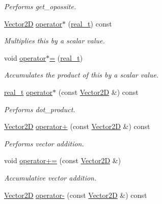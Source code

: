 \begin{DoxyCompactItemize}
\begin{DoxyCompactList}\small\item\em Performs get\+\_\+opossite. \end{DoxyCompactList}\item 
\hyperlink{class_designar_1_1_vector2_d}{Vector2D} \hyperlink{class_designar_1_1_vector2_d_ad0e749363b81d3ec6eb87d7e7d378f63}{operator$\ast$} (\hyperlink{namespace_designar_aca2c32af26808dbec1f3a3071fad25ce}{real\+\_\+t}) const
\begin{DoxyCompactList}\small\item\em Multiplies this by a scalar value. \end{DoxyCompactList}\item 
void \hyperlink{class_designar_1_1_vector2_d_a12aff184fa16acaed9ca926de4fb99c1}{operator$\ast$=} (\hyperlink{namespace_designar_aca2c32af26808dbec1f3a3071fad25ce}{real\+\_\+t})
\begin{DoxyCompactList}\small\item\em Accumulates the product of this by a scalar value. \end{DoxyCompactList}\item 
\hyperlink{namespace_designar_aca2c32af26808dbec1f3a3071fad25ce}{real\+\_\+t} \hyperlink{class_designar_1_1_vector2_d_adb2e691651f7168e964c248e1cd8468f}{operator$\ast$} (const \hyperlink{class_designar_1_1_vector2_d}{Vector2D} \&) const
\begin{DoxyCompactList}\small\item\em Performs dot\+\_\+product. \end{DoxyCompactList}\item 
\hyperlink{class_designar_1_1_vector2_d}{Vector2D} \hyperlink{class_designar_1_1_vector2_d_a3eec236f5ec777d13f5c42774b699b92}{operator+} (const \hyperlink{class_designar_1_1_vector2_d}{Vector2D} \&) const
\begin{DoxyCompactList}\small\item\em Performs vector addition. \end{DoxyCompactList}\item 
void \hyperlink{class_designar_1_1_vector2_d_a92e6693a60fa7c01e5b187d04f8b98d6}{operator+=} (const \hyperlink{class_designar_1_1_vector2_d}{Vector2D} \&)
\begin{DoxyCompactList}\small\item\em Accumulative vector addition. \end{DoxyCompactList}\item 
\hyperlink{class_designar_1_1_vector2_d}{Vector2D} \hyperlink{class_designar_1_1_vector2_d_a82ea24d412f8be289560516b94841348}{operator-\/} (const \hyperlink{class_designar_1_1_vector2_d}{Vector2D} \&) const

\end{DoxyCompactItemize}
